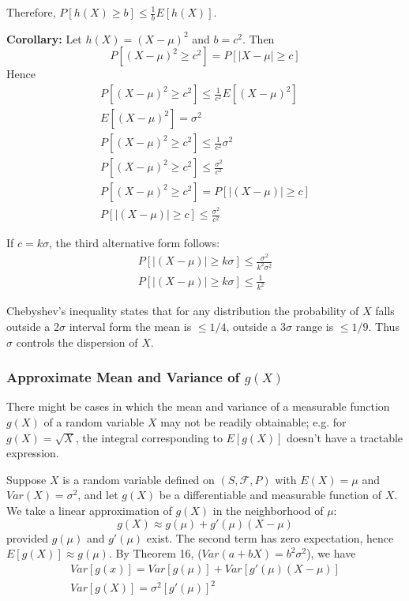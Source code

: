 \documentclass{article}
\begin{document}
Therefore, \(P[h(X) \geq b] \leq \frac{1}{b} E[h(X)]\).

\textbf{Corollary:} Let \(h(X) = (X-\mu)^2\) and \(b=c^2\). Then
\begin{equation*}
    P[(X-\mu)^2 \geq c^2] = P[|X-\mu| \geq c]
\end{equation*}
Hence
\begin{equation*}
\begin{split}
    P[(X-\mu)^2 \geq c^2] \leq \frac{1}{c^2} E[(X-\mu)^2] \\
    E[(X-\mu)^2] = \sigma^2 \\
    P[(X-\mu)^2 \geq c^2] \leq \frac{1}{c^2} \sigma^2 \\
    P[(X-\mu)^2 \geq c^2] \leq \frac{\sigma^2}{c^2} \\
    P[(X-\mu)^2 \geq c^2] = P[|(X-\mu)|\geq c] \\
    P[|(X-\mu)|\geq c] \leq \frac{\sigma^2}{c^2}
\end{split}
\end{equation*}

If \(c=k\sigma\), the third alternative form follows:
\begin{equation*}
\begin{split}
        P[|(X-\mu)|\geq k\sigma] \leq \frac{\sigma^2} {k^2\sigma^2} \\
         P[|(X-\mu)|\geq k\sigma] \leq \frac{1} {k^2}
\end{split}
\end{equation*}

Chebyshev's inequality states that for any distribution the probability of \(X\) falls outside a 2$\sigma$ interval form the mean is $\leq 1/4$, outside a 3$\sigma$ range is $\leq 1/9$. Thus $\sigma$ controls the dispersion of \(X\).

\subsubsection{Approximate Mean and Variance of \(g(X)\)}

There might be cases in which the mean and variance of a measurable function \(g(X)\) of a random variable \(X\) may not be readily obtainable; e.g. for \(g(X) = \sqrt{X}\), the integral corresponding to \(E[g(X)]\) doesn't have a tractable expression.

Suppose \(X\) is a random variable defined on \((S, \mathcal{F},P)\) with \(E(X)=\mu\) and \(Var(X)=\sigma^2\), and let \(g(X)\) be a differentiable and measurable function of \(X\). We take a linear approximation of \(g(X)\) in the neighborhood of $\mu$:
\begin{equation*}
    g(X) \approx g(\mu)+g'(\mu)(X-\mu)
\end{equation*}
provided \(g(\mu)\) and \(g'(\mu)\) exist. The second term has zero expectation, hence \(E[g(X)] \approx g(\mu)\). By Theorem 16, (\(Var(a+ bX) = b^2\sigma^2\)), we have
\begin{equation*}
\begin{split}
    Var[g(x)] = Var[g(\mu)] + Var[g'(\mu)(X-\mu)] \\
    Var[g(X)] = \sigma^2[g'(\mu)]^2
\end{split}
\end{equation*}
\end{document}
